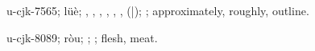 \begin{multicols}{2}
{\cjkgGlue{}u-cjk-7565; lüè; \cjkgGlue{}, \cjkgGlue{}\cjkgGlue{}\cjkgGlue{}, \cjkgGlue{}\cjkgGlue{}\cjkgGlue{}, \cjkgGlue{}, \cjkgGlue{}\cjkgGlue{}\cjkgGlue{}, \cjkgGlue{}\cjkgGlue{}\cjkgGlue{}, \cjkgGlue{}\cjkgGlue{}(\cjkgGlue{}|\cjkgGlue{}); \cjkgGlue{}; approximately, roughly, outline.

\cjkgGlue{}u-cjk-8089; ròu; \cjkgGlue{}; \cjkgGlue{}; flesh, meat.

}
\end{multicols}
